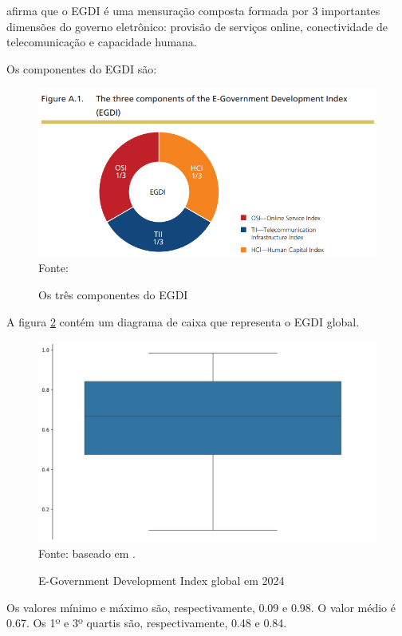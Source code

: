 \cite{ONU_EGDI} afirma que o EGDI é uma mensuração composta formada por 3 importantes dimensões do governo eletrônico: provisão de serviços online, conectividade de telecomunicação e capacidade humana.

Os componentes do EGDI são:

\begin{figure}[H]
	\centering
	\caption{Os três componentes do EGDI}
	\includegraphics[width=1\linewidth]{figuras/egdi/egdi_componentes.png}
	\label{fig:egdi_componentes}
	\footnotesize{Fonte: \cite{ONU_EGDI_methodology}}
\end{figure}

A figura \ref{fig:boxplot_egov_global} contém um diagrama de caixa que representa o EGDI global.

\begin{figure}[H]
	\centering
	\caption{E-Government Development Index global em 2024}
	\includegraphics[width=1\linewidth]{figuras/egdi/boxplot_egov_global.png}
	\label{fig:boxplot_egov_global}
	\footnotesize{Fonte: baseado em \cite{ONU_EGDI_mapa}.}
\end{figure}

Os valores mínimo e máximo são, respectivamente, 0.09 e 0.98. O  valor médio é 0.67. Os 1º e 3º quartis são, respectivamente, 0.48 e 0.84.

